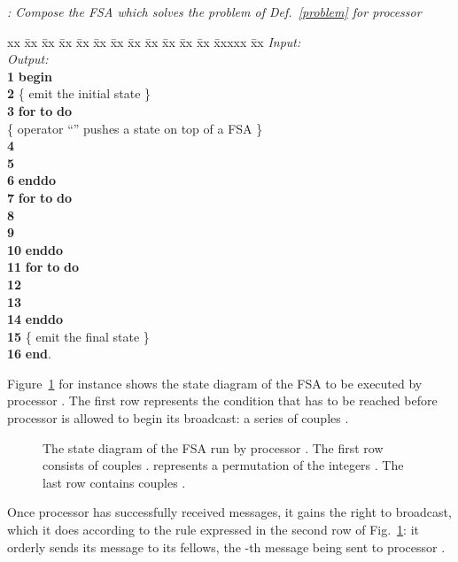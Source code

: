\documentclass{elsart}
\newcommand{\keyw}[1]{\hbox{\bf #1}}
\begin{document}
\begin{alg}{\emph{: Compose the FSA which solves the problem of Def.~\ref{problem} for processor }}
\begin{tabbing}
xx \= xx \= xx \= xx \= xx \= xx \= xx \= xx \= xx \= xx \= xx \= xx \= xxxxx \= xx \kill
         \> \> \emph{Input:\/} \\
         \> \> \emph{Output:\/} \\
{\bf  1} \> \> \keyw{begin}\\
{\bf  2} \> \> \>  \>\>\>\>\>\>\>\>\>\> \{ emit the initial state \} \\
{\bf  3} \> \> \> \keyw{for}  \keyw{to}  \keyw{do} \\
         \> \> \> \> \{ operator ``'' pushes a state on top of a FSA \} \\
{\bf  4} \> \> \> \>  \\
{\bf  5} \> \> \> \>  \\
{\bf  6} \> \> \> \keyw{enddo}\\
{\bf  7} \> \> \> \keyw{for}  \keyw{to}  \keyw{do} \\
{\bf  8} \> \> \> \> \\
{\bf  9} \> \> \> \> \\
{\bf 10} \> \> \> \keyw{enddo}\\
{\bf 11} \> \> \> \keyw{for}  \keyw{to}  \keyw{do}\\
{\bf 12} \> \> \> \> \\
{\bf 13} \> \> \> \> \\
{\bf 14} \> \> \> \keyw{enddo}\\
{\bf 15} \> \> \>  \>\>\>\>\>\>\>\>\>\> \{ emit the final  state \} \\
{\bf 16} \> \> \keyw{end}.
\end{tabbing}
\label{alg1}
\end{alg}


Figure~\ref{fsa} for instance shows the state diagram of the FSA
to be executed by processor .
The first row represents the condition that has to be reached before 
processor  is allowed to begin its broadcast: a series 
of  couples .

\begin{figure}
\centerline{}
\caption{The state diagram of the FSA run by processor . The first
row consists of  couples .
 represents a permutation of the  integers
.
The last row contains  couples .
}\label{fsa}
\end{figure}

Once processor  has successfully received  messages, it gains 
the right to broadcast, which it does according to the rule expressed in 
the second row of Fig.~\ref{fsa}: it orderly sends its message to
its fellows, the -th message being sent to processor .
\end{document}
